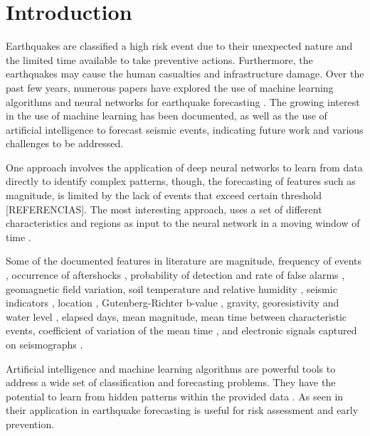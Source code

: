 \documentclass[sn-mathphys-num]{sn-jnl}
\begin{document}
\section{Introduction}\label{introduction}

Earthquakes are classified a high risk event due to their unexpected nature and the limited time available to take preventive actions. Furthermore, the earthquakes may cause the human casualties and infrastructure damage. Over the past few years, numerous papers have explored the use of machine learning algorithms and neural networks for earthquake forecasting \cite{banna_application_2020, florido_earthquake_2016, mignan_neural_2020, jiao_artificial_2020, galkina_machine_nodate, kong_machine_2019}. The growing interest in the use of machine learning has been documented, as well as the use of artificial intelligence to forecast seismic events, indicating future work and various challenges to be addressed.

One approach involves the application of deep neural networks to learn from data directly to identify complex patterns, though, the forecasting of features such as magnitude, is limited by the lack of events that exceed certain threshold [REFERENCIAS]. The most interesting approach, uses a set of different characteristics and regions as input to the neural network in a moving window of time \cite{wang_earthquake_2020}. 

Some of the documented features in literature are magnitude, frequency of events \cite{han_medium-_1997,de_falco_seismicity_2000,bodri_neural-network_2001,wang_support_2006,sri_lakshmi_model_2009}, occurrence of aftershocks \cite{lin_forecast_2002}, probability of detection and rate of false alarms \cite{panakkat_neural_2007} , geomagnetic field variation, soil temperature and relative humidity \cite{suratgar_magnitude_2008}, seismic indicators \cite{panakkat_recurrent_2009}, location \cite{veri_earthquake_2012}, Gutenberg-Richter b-value \cite{morales-esteban_earthquake_2013,reyes_neural_2013,asenciocortes_earthquake_2018}, gravity, georesistivity and water level \cite{cai_anomaly_2019}, elapsed days, mean magnitude, mean time between characteristic events, coefficient of variation of the mean time \cite{banna_attention-based_2021}, and electronic signals captured on seismographs \cite{bose_preseis_2008,lakkos_neural_1994,rovithakis_neural_2000,ifantis_support_2003,radeva_real-time_2005,bernardo-torres_one-step_2009}.

Artificial intelligence and machine learning algorithms are powerful tools to address a wide set of classification and forecasting problems. They have the potential to learn from hidden patterns within the provided data \cite{kong_machine_2019}. As seen in \cite{kong_machine_2019, bose_preseis_2008} their application in earthquake forecasting is useful for risk assessment and early prevention. 
\end{document}
